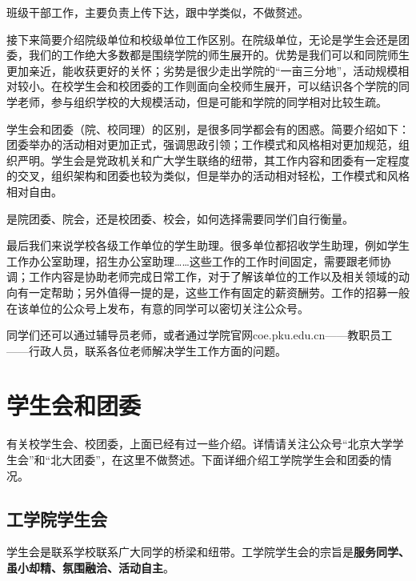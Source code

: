 \documentclass[11pt,oneside]{book}
\begin{document}
班级干部工作，主要负责上传下达，跟中学类似，不做赘述。

\vspace{10pt}

接下来简要介绍院级单位和校级单位工作区别。在院级单位，无论是学生会还是团委，我们的工作绝大多数都是围绕学院的师生展开的。优势是我们可以和同院师生更加亲近，能收获更好的关怀；劣势是很少走出学院的“一亩三分地”，活动规模相对较小。在校学生会和校团委的工作则面向全校师生展开，可以结识各个学院的同学老师，参与组织学校的大规模活动，但是可能和学院的同学相对比较生疏。

\vspace{10pt}

学生会和团委（院、校同理）的区别，是很多同学都会有的困惑。简要介绍如下：团委举办的活动相对更加正式，强调思政引领；工作模式和风格相对更加规范，组织严明。学生会是党政机关和广大学生联络的纽带，其工作内容和团委有一定程度的交叉，组织架构和团委也较为类似，但是举办的活动相对轻松，工作模式和风格相对自由。

\vspace{10pt}

是院团委、院会，还是校团委、校会，如何选择需要同学们自行衡量。

\vspace{10pt}

最后我们来说学校各级工作单位的学生助理。很多单位都招收学生助理，例如学生工作办公室助理，招生办公室助理……这些工作的工作时间固定，需要跟老师协调；工作内容是协助老师完成日常工作，对于了解该单位的工作以及相关领域的动向有一定帮助；另外值得一提的是，这些工作有固定的薪资酬劳。工作的招募一般在该单位的公众号上发布，有意的同学可以密切关注公众号。

\vspace{10pt}

同学们还可以通过辅导员老师，或者通过学院官网coe.pku.edu.cn——教职员工——行政人员，联系各位老师解决学生工作方面的问题。

\section{学生会和团委}
有关校学生会、校团委，上面已经有过一些介绍。详情请关注公众号“北京大学学生会”和“北大团委”，在这里不做赘述。下面详细介绍工学院学生会和团委的情况。

\subsection{工学院学生会}
学生会是联系学校联系广大同学的桥梁和纽带。工学院学生会的宗旨是\textbf{服务同学、虽小却精、氛围融洽、活动自主}。
\end{document}
